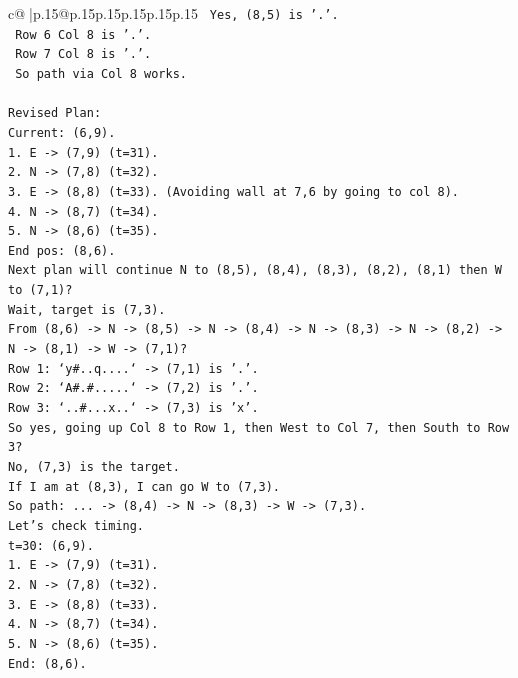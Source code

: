\documentclass{article}
\begin{document}
{\begin{supertabular}{c@{$\;$}|p{.15\linewidth}@{}p{.15\linewidth}p{.15\linewidth}p{.15\linewidth}p{.15\linewidth}p{.15\linewidth}}
{{{\texttt{   Yes, (8,5) is '.'.} \\
\texttt{   Row 6 Col 8 is '.'.} \\
\texttt{   Row 7 Col 8 is '.'.} \\
\texttt{   So path via Col 8 works.} \\
\\ 
\texttt{Revised Plan:} \\
\texttt{Current: (6,9).} \\
\texttt{1. E {-}> (7,9) (t=31).} \\
\texttt{2. N {-}> (7,8) (t=32).} \\
\texttt{3. E {-}> (8,8) (t=33). (Avoiding wall at 7,6 by going to col 8).} \\
\texttt{4. N {-}> (8,7) (t=34).} \\
\texttt{5. N {-}> (8,6) (t=35).} \\
\texttt{End pos: (8,6).} \\
\texttt{Next plan will continue N to (8,5), (8,4), (8,3), (8,2), (8,1) then W to (7,1)?} \\
\texttt{Wait, target is (7,3).} \\
\texttt{From (8,6) {-}> N {-}> (8,5) {-}> N {-}> (8,4) {-}> N {-}> (8,3) {-}> N {-}> (8,2) {-}> N {-}> (8,1) {-}> W {-}> (7,1)?} \\
\texttt{Row 1: `y\#..q....` {-}> (7,1) is '.'.} \\
\texttt{Row 2: `A\#.\#.....` {-}> (7,2) is '.'.} \\
\texttt{Row 3: `..\#...x..` {-}> (7,3) is 'x'.} \\
\texttt{So yes, going up Col 8 to Row 1, then West to Col 7, then South to Row 3?} \\
\texttt{No, (7,3) is the target.} \\
\texttt{If I am at (8,3), I can go W to (7,3).} \\
\texttt{So path: ... {-}> (8,4) {-}> N {-}> (8,3) {-}> W {-}> (7,3).} \\
\texttt{Let's check timing.} \\
\texttt{t=30: (6,9).} \\
\texttt{1. E {-}> (7,9) (t=31).} \\
\texttt{2. N {-}> (7,8) (t=32).} \\
\texttt{3. E {-}> (8,8) (t=33).} \\
\texttt{4. N {-}> (8,7) (t=34).} \\
\texttt{5. N {-}> (8,6) (t=35).} \\
\texttt{End: (8,6).} \\
}}}
\end{supertabular}}
\end{document}
